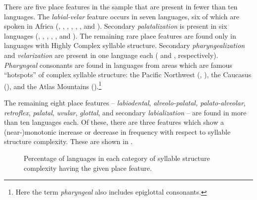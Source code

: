   There are five place features in the sample that are present in fewer than ten languages. The \textit{labial-velar} feature occurs in seven languages, six of which are spoken in Africa (, , , , , , and ). Secondary \textit{palatalization} is present in six languages (, , , , , and ). The remaining rare place features are found only in languages with Highly Complex syllable structure. Secondary \textit{pharyngealization} and \textit{velarization} are present in one language each ( and , respectively). \textit{Pharyngeal} consonants are found in languages from areas which are famous ``hotspots'' of complex syllable structure: the Pacific Northwest (, ), the Caucasus (), and the Atlas Mountains ().\footnote{{Here the term} \textrm{\textit{pharyngeal} }\textrm{also includes epiglottal consonants.}}

  The remaining eight place features -- \textit{labiodental}, \textit{alveolo-palatal, palato-alveo\-lar}, \textit{retroflex}, \textit{palatal}, \textit{uvular}, \textit{glottal}, and secondary \textit{labialization} -- are found in more than ten languages each. Of these, there are three features which show a \mbox{(near-)}\linebreak monotonic increase or decrease in frequency with respect to syllable structure complexity. These are shown in .

\begin{figure}
\caption{\label{fig:4.8}Percentage of languages in each category of syllable structure complexity having the given place feature.}
\end{figure}

